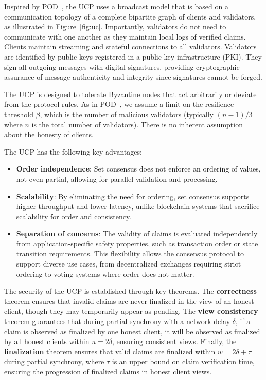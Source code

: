 \documentclass{article}
\begin{document}
Inspired by POD~\cite{AlposADZ:2025}, the UCP uses a broadcast model that is based on a communication topology of a complete bipartite graph of clients and validators, as illustrated in Figure~\ref{fig:uc}. Importantly, validators do not need to communicate with one another as they maintain local logs of verified claims. Clients maintain streaming and stateful connections to all validators.
Validators are identified by public keys registered in a public key infrastructure (PKI). They sign all outgoing messages with digital signatures, providing cryptographic assurance of message authenticity and integrity since signatures cannot be forged.

The UCP is designed to tolerate Byzantine nodes that act arbitrarily or deviate from the protocol rules. As in POD~\cite{AlposADZ:2025}, we assume a limit on the resilience threshold $\beta$, which is the number of malicious validators (typically $(n-1)/3$ where $n$ is the total number of validators). There is no inherent assumption about the honesty of clients.


The UCP has the following key advantages:
\begin{itemize}
\item \textbf{Order independence}: Set consensus does not enforce an ordering of values, not even partial, allowing for parallel validation and processing.
\item \textbf{Scalability}: By eliminating the need for ordering, set consensus supports higher throughput and lower latency, unlike blockchain systems that sacrifice scalability for order and consistency.
\item \textbf{Separation of concerns}: The validity of claims is evaluated independently from application-specific safety properties, such as transaction order or state transition requirements. This flexibility allows the consensus protocol to support diverse use cases, from decentralized exchanges requiring strict ordering to voting systems where order does not matter.
\end{itemize}

The security of the UCP is established through key theorems. The \textbf{correctness} theorem ensures that invalid claims are never finalized in the view of an honest client, though they may temporarily appear as pending. The \textbf{view consistency} theorem guarantees that during partial synchrony with a network delay $\delta$, if a claim is observed as finalized by one honest client, it will be observed as finalized by all honest clients within $u = 2\delta$, ensuring consistent views. Finally, the \textbf{finalization} theorem ensures that valid claims are finalized within $w = 2\delta + \tau$ during partial synchrony, where $\tau$ is an upper bound on claim verification time, ensuring the progression of finalized claims in honest client views.
\end{document}
